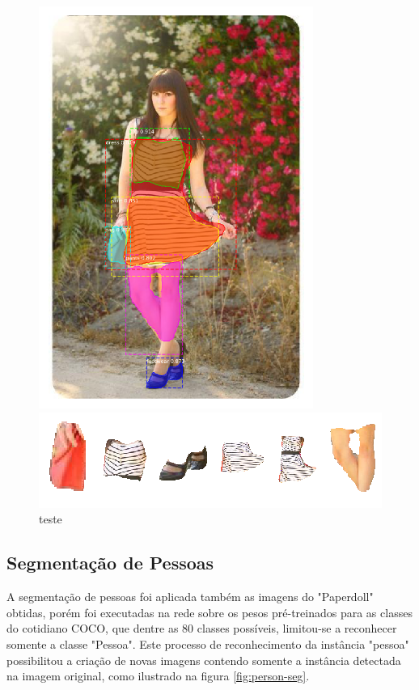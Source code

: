 \documentclass[12pt]{report}
\begin{document}
\begin{figure}
\begin{minipage}[b]{0.48\textwidth}
    \includegraphics[width=0.8\textwidth]{images/resultados/490842roupas.png}
    \caption{}
  \end{minipage}
    \hfill
  \begin{minipage}[b]{0.7\textwidth}
    \includegraphics[width=\textwidth]{images/resultados/2.png}
    \caption{}
  \end{minipage}
  \caption{teste}
  \label{fig:moda-seg2}
\end{figure}

\subsection{Segmentação de Pessoas}

A segmentação de pessoas foi aplicada também as imagens do "Paperdoll" obtidas, porém foi executadas na rede sobre os pesos pré-treinados para as classes do cotidiano COCO, que dentre as 80 classes possíveis, limitou-se a reconhecer somente a classe "Pessoa". Este processo de reconhecimento da instância "pessoa" possibilitou a criação de novas imagens contendo somente a instância detectada na imagem original, como ilustrado na figura \ref{fig:person-seg}. 
\end{document}
